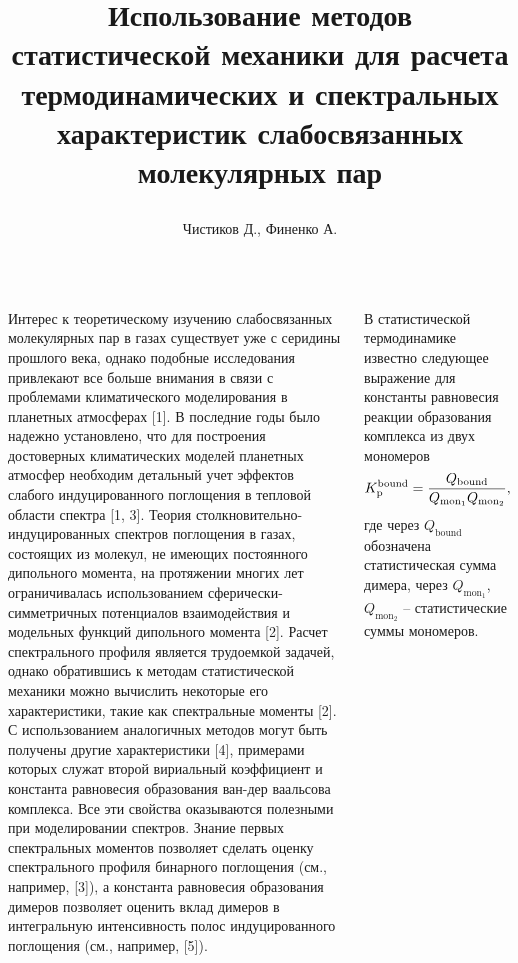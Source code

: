 \documentclass[
  14pt,
  a1paper,
  portrait, 
  margin=0mm,
  innermargin=15mm,
  blockverticalspace=0mm,
  colspace=0mm,
  subcolspace=0mm
]{tikzposter}
\title{\parbox{0.75\linewidth}{\centering Использование методов статистической механики для расчета термодинамических и спектральных характеристик слабосвязанных молекулярных пар}}
\author{Чистиков Д., Финенко А.}
\institute{МГУ имени М.В. Ломоносова, Химический факультет}
\begin{document}
\maketitle[width=1.0\linewidth, titletotopverticalspace=0.1cm, titletoblockverticalspace=0.3cm]

\vspace*{-5cm}

\begin{columns}

{
	Интерес к теоретическому изучению слабосвязанных молекулярных пар в газах существует уже с серидины прошлого века, однако подобные исследования привлекают все больше внимания в связи с проблемами климатического моделирования в планетных атмосферах [1]. В последние годы было надежно установлено, что для построения достоверных климатических моделей планетных атмосфер необходим детальный учет эффектов слабого индуцированного поглощения в тепловой области спектра [1, 3]. Теория столкновительно-индуцированных спектров поглощения в газах, состоящих из молекул, не имеющих постоянного дипольного момента, на протяжении многих лет ограничивалась использованием сферически-симметричных потенциалов взаимодействия и модельных функций дипольного момента [2]. Расчет спектрального профиля является трудоемкой задачей, однако обратившись к методам статистической механики можно вычислить некоторые его характеристики, такие как спектральные моменты [2]. С использованием аналогичных методов могут быть получены другие характеристики [4], примерами которых служат второй вириальный коэффициент и константа равновесия образования ван-дер ваальсова комплекса. Все эти свойства оказываются полезными при моделировании спектров. Знание первых спектральных моментов позволяет сделать оценку спектрального профиля бинарного поглощения (см., например, [3]), а константа равновесия образования димеров позволяет оценить вклад димеров в интегральную интенсивность полос индуцированного поглощения (см., например, [5]). 
}

{
	В статистической термодинамике известно следующее выражение для константы равновесия реакции образования комплекса из двух мономеров
	\begin{gather}
			K_\textup{p}^\textup{bound} = \frac{Q_\text{bound}}{Q_{\text{mon}_1} Q_{\text{mon}_2}} \label{0.1},
	\end{gather}
	где через $Q_\text{bound}$ обозначена статистическая сумма димера, через $Q_{\text{mon}_1}$, $Q_{\text{mon}_2}$ -- статистические суммы мономеров. \par

}
\end{columns}
\end{document}
